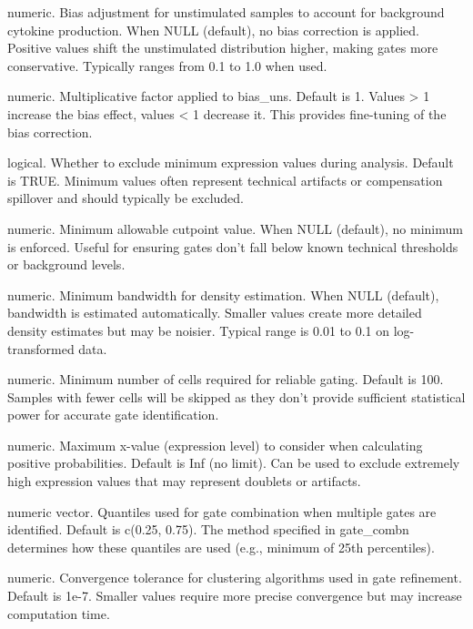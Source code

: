 \documentclass[letterpaper]{book}
\begin{document}
\begin{Arguments}
\begin{ldescription}
\item[\code{bias\_uns}] numeric. Bias adjustment for unstimulated samples to account for
background cytokine production. When NULL (default), no bias correction is applied.
Positive values shift the unstimulated distribution higher, making gates more
conservative. Typically ranges from 0.1 to 1.0 when used.

\item[\code{bias\_uns\_factor}] numeric. Multiplicative factor applied to bias\_uns.
Default is 1. Values > 1 increase the bias effect, values < 1 decrease it.
This provides fine-tuning of the bias correction.

\item[\code{exc\_min}] logical. Whether to exclude minimum expression values during
analysis. Default is TRUE. Minimum values often represent technical artifacts
or compensation spillover and should typically be excluded.

\item[\code{cp\_min}] numeric. Minimum allowable cutpoint value. When NULL (default),
no minimum is enforced. Useful for ensuring gates don't fall below known
technical thresholds or background levels.

\item[\code{bw\_min}] numeric. Minimum bandwidth for density estimation. When NULL (default),
bandwidth is estimated automatically. Smaller values create more detailed density
estimates but may be noisier. Typical range is 0.01 to 0.1 on log-transformed data.

\item[\code{min\_cell}] numeric. Minimum number of cells required for reliable gating.
Default is 100. Samples with fewer cells will be skipped as they don't provide
sufficient statistical power for accurate gate identification.

\item[\code{max\_pos\_prob\_x}] numeric. Maximum x-value (expression level) to consider
when calculating positive probabilities. Default is Inf (no limit). Can be used
to exclude extremely high expression values that may represent doublets or artifacts.

\item[\code{gate\_quant}] numeric vector. Quantiles used for gate combination when multiple
gates are identified. Default is c(0.25, 0.75). The method specified in gate\_combn
determines how these quantiles are used (e.g., minimum of 25th percentiles).

\item[\code{tol\_clust}] numeric. Convergence tolerance for clustering algorithms used in
gate refinement. Default is 1e-7. Smaller values require more precise convergence
but may increase computation time.


\end{ldescription}
\end{Arguments}
\end{document}
